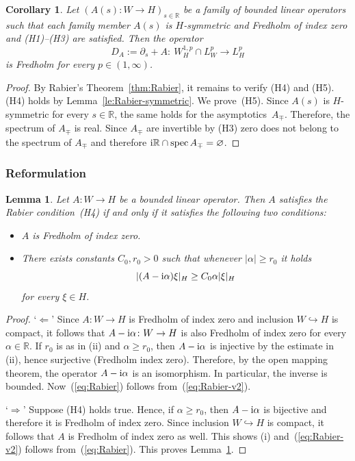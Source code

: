 \documentclass[pdftex]{sigma}
\numberwithin{equation}{section}
\newtheorem{Corollary}[Theorem]{Corollary}
\newtheorem{Lemma}[Theorem]{Lemma}
\newcommand{\R}{{\mathbb{R}}}
\newcommand{\spec}{\mathrm{spec}\,} %
\def\abs#1{\mathopen|#1\mathclose|}
\newcommand{\p}{{\partial}}
\newcommand{\INTO}{\hookrightarrow} %
\newcommand{\1}{{{\mathchoice {\rm 1\mskip-4mu l} {\rm 1\mskip-4mu l}
{\rm 1\mskip-4.5mu l} {\rm 1\mskip-5mu l}}}}
\begin{document}
\begin{Corollary}\label{cor:symm-Fredholm}
Let $(A(s) \colon W\to H)_{s\in\R}$ be a family of bounded linear operators
such that each family member $A(s)$ is
$H$-symmetric and Fredholm of index zero
and {\rm (H1)--(H3)} are satisfied.
Then the operator
\[
 D_A:=\p_s+A
 \colon\ W^{1,p}_{H}\cap L^p_{W}\to L^p_H
\]
is Fredholm for every $p\in(1,\infty)$.
\end{Corollary}

\begin{proof}
By Rabier's Theorem~\ref{thm:Rabier},
it remains to verify (H4) and (H5).
(H4) holds by Lemma~\ref{le:Rabier-symmetric}.
We prove~(H5).
Since $A(s)$ is $H$-symmetric for every $s\in\R$, the
same holds for the asymptotics~$A_\mp$.
Therefore, the spectrum of $A_\mp$ is real.
Since $A_\mp$ are invertible by (H3)
zero does not belong to the spectrum of $A_\mp$
and therefore ${\rm i}\R\cap\spec A_\mp=\varnothing$.
\end{proof}

\subsubsection*{Reformulation}

\begin{Lemma}\label{le:Rabier-v2}
Let $A\colon W\to H$ be a bounded linear operator.
Then $A$ satisfies the Rabier condition~{\rm (H4)} if and only if it
satisfies the following two conditions:
\begin{itemize}\itemsep=0ex
\item[$(i)$]
 $A$ is Fredholm of index zero.
\item[$(ii)$]
 There exists constants $C_0,r_0>0$ such that
 whenever $\abs{\alpha}\ge r_0$ it holds
 \begin{equation}\label{eq:Rabier-v2}
 \abs{(A-{\rm i}\alpha)\xi}_{H}
 \ge C_0\alpha \abs{\xi}_{H}
 \end{equation}
 for every $\xi\in H$.
\end{itemize}
\end{Lemma}

\begin{proof}%
`$\Leftarrow$'
Since $A\colon W\to H$ is Fredholm of index zero and inclusion
$W\INTO H$ is compact,
it follows that $A-{\rm i}\alpha\colon W\to H$ is also Fredholm of index
zero for every $\alpha\in\R$.
If $r_0$ is as in (ii) and $\alpha\ge r_0$, then $A-{\rm i}\alpha$ is
injective by the estimate in (ii), hence surjective (Fredholm index zero).
Therefore, by the open mapping theorem, the operator $A-{\rm i}\alpha$ is
an isomorphism. In particular, the inverse  is bounded.
Now~(\ref{eq:Rabier}) follows from~(\ref{eq:Rabier-v2}).


`$\Rightarrow$'
Suppose (H4) holds true.
Hence, if $\alpha\ge r_0$, then $A-{\rm i}\alpha$ is bijective
and therefore it is Fredholm of index zero.
%
Since inclusion $W\INTO H$ is compact, it follows that $A$
is Fredholm of index zero as well.
This shows (i) and~(\ref{eq:Rabier-v2}) follows from~(\ref{eq:Rabier}).
This proves Lemma~\ref{le:Rabier-v2}.
\end{proof}
\end{document}
